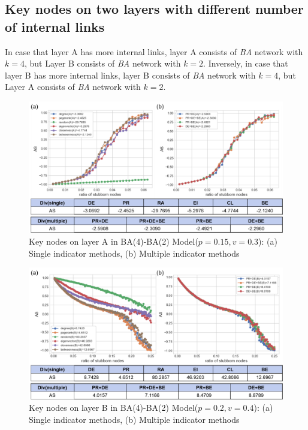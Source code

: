 \subsection{Key nodes on two layers with different number of internal links}
In case that layer A has more internal links, layer A consists of \textit{BA} network with $k=4$, but Layer B consists of \textit{BA} network with $k=2$. Inversely, in case that layer B has more internal links, layer B consists of \textit{BA} network with $k=4$, but Layer A consists of \textit{BA} network with $k=2$. 
\begin{figure}[!htb]
	\centering
	\includegraphics[width=\hsize]{figure/chap5_keynode_internal_A.png}
	\caption{Key nodes on layer A in BA(4)-BA(2) Model($p=0.15, v=0.3$):
		(a) Single indicator methods, (b) Multiple indicator methods}
	\label{chap5_keynode_internal_A}
\end{figure}
\begin{figure}[!htb]
	\centering
	\includegraphics[width=\hsize]{figure/chap5_keynode_internal_B.png}
	\caption{Key nodes on layer B in BA(4)-BA(2) Model($p=0.2, v=0.4$):
		(a) Single indicator methods, (b) Multiple indicator methods}
	\label{chap5_keynode_internal_B}
\end{figure}
